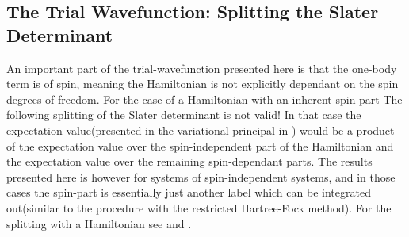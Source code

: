     \subsection{The Trial Wavefunction: Splitting the Slater Determinant}
        An important part of the trial-wavefunction presented here is that the
        one-body term is  of spin, meaning the Hamiltonian
        is not explicitly dependant on the spin degrees of freedom. For the
        case of a Hamiltonian with an inherent spin part The following
        splitting of the Slater determinant is not valid! In that case the
        expectation value(presented in the variational principal in
        ) would be a product of the expectation value over the
        spin-independent part of the Hamiltonian and the expectation value over
        the remaining spin-dependant parts\cite{spinDep}. The results presented
        here is however for systems of spin-independent systems, and in those
        cases the spin-part is essentially just another label which can be
        integrated out(similar to the procedure with the restricted
        Hartree-Fock method). For the splitting with a 
        Hamiltonian see \cite{splitDet} and \cite{basicMB}. \\
        
